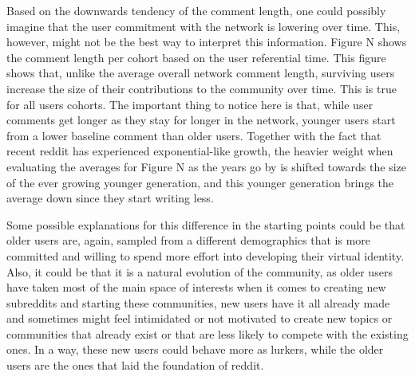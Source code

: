Based on the downwards tendency of the comment length, one could possibly imagine that the user commitment with the network is lowering over time. This, however, might not be the best way to interpret this information. Figure N shows the comment length per cohort based on the user referential time. This figure shows that, unlike the average overall network comment length, surviving users increase the size of their contributions to the community over time. This is true for all users cohorts. The important thing to notice here is that, while user comments get longer as they stay for longer in the network, younger users start from a lower baseline comment than older users. Together with the fact that recent reddit has experienced exponential-like growth, the heavier weight when evaluating the averages for Figure N as the years go by is shifted towards the size of the ever growing younger generation, and this younger generation brings the average down since they start writing less.

Some possible explanations for this difference in the starting points could be that older users are, again, sampled from a different demographics that is more committed and willing to spend more effort into developing their virtual identity. Also, it could be that it is a natural evolution of the community, as older users have taken most of the main space of interests when it comes to creating new subreddits and starting these communities, new users have it all already made and sometimes might feel intimidated or not motivated to create new topics or communities that already exist or that are less likely to compete with the existing ones. In a way, these new users could behave more as lurkers, while the older users are the ones that laid the foundation of reddit.

